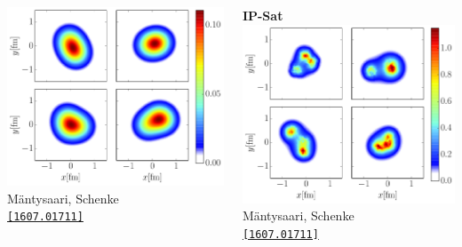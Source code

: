 \documentclass[aspectratio=169,11pt,usenames,dvipsnames]{beamer}
\begin{document}
\begin{frame}[noframenumbering]
{\begin{columns}[onlytextwidth,c]
\begin{center}
                \includegraphics[width=0.7\columnwidth]{images/density_smooth.pdf}
                \\[-6pt]
                {\tiny Mäntysaari, Schenke} \\ \tiny \href{https://arxiv.org/abs/1607.01711}{\color{blue}\texttt{[1607.01711]}\scalebox{.6}{$^\text{\tiny\faExternalLink}$}}
            \end{center}
            \begin{center}
                {\scriptsize\bfseries IP-Sat}
                \\[1pt]
                \includegraphics[width=0.7\columnwidth]{images/density_ipglasma.pdf}
                \\[-6pt]
                {\tiny Mäntysaari, Schenke} \\ \tiny \href{https://arxiv.org/abs/1607.01711}{\color{blue}\texttt{[1607.01711]}\scalebox{.6}{$^\text{\tiny\faExternalLink}$}}
            \end{center}

\end{columns}}
\end{frame}
\end{document}
